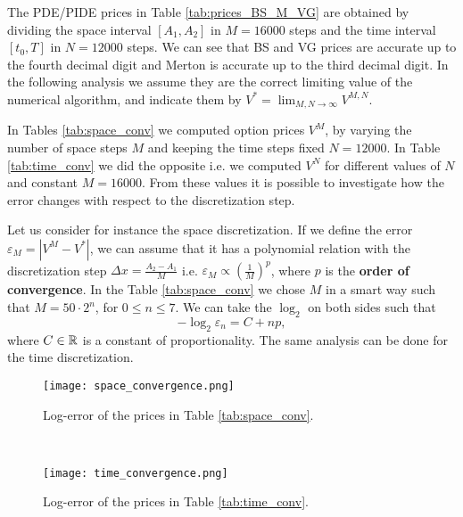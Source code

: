 The PDE/PIDE prices in Table \ref{tab:prices_BS_M_VG} are obtained by dividing the space interval $[A_1,A_2]$ in $M=16000$ steps and the time interval $[t_0,T]$ in $N=12000$ steps.
We can see that BS and VG prices are accurate up to the fourth decimal digit and Merton is accurate up to the third decimal digit. 
In the following analysis we assume they are the correct limiting 
value of the numerical algorithm, and indicate them by $V^* = \lim_{M,N \to \infty} V^{M,N}$.

In Tables \ref{tab:space_conv} we computed option prices $V^M$, by varying the number of space steps $M$ and keeping the time steps fixed $N=12000$.
In Table \ref{tab:time_conv} we did the opposite i.e. we computed $V^N$ for different values of $N$ and constant $M=16000$.
From these values it is possible to investigate how the error changes with respect to the discretization step.

Let us consider for instance the space discretization. 
If we define the error $\varepsilon_M = |V^M - V^*|$, we can assume that it has a polynomial relation with the discretization step $\Delta x = \frac{A_2 - A_1}{M}$ i.e. 
$\varepsilon_M \propto (\frac{1}{M})^p$, where $p$ is the \textbf{order of convergence}.
In the Table \ref{tab:space_conv} we chose $M$ in a smart way such that $M = 50\cdot2^n$, for $0 \leq n \leq 7$. We can take the $\log_2$ on both sides such that
\begin{equation}
 - \log_2 \varepsilon_n = C + np,
\end{equation}
where $C\in \mathbb{R}$ is a constant of proportionality. 
The same analysis can be done for the time discretization.
\begin{figure}[t!]
 \begin{minipage}[b]{0.5\linewidth}
   \centering
 \texttt{[image: space\_convergence.png]}
 \caption{Log-error of the prices in Table \ref{tab:space_conv}.}
 \label{fig_space}
  \end{minipage}
 \ \hspace{2mm} \hspace{3mm} \
 \begin{minipage}[b]{0.5\linewidth}
 \centering
 \texttt{[image: time\_convergence.png]}
 \caption{Log-error of the prices in Table \ref{tab:time_conv}.}
 \label{fig_time}
 \end{minipage}
\end{figure}

